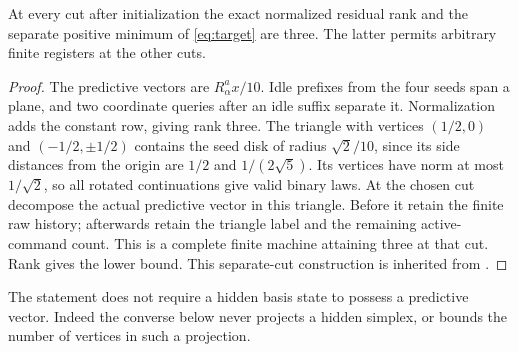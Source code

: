 \begin{proposition}\label{prop:separate}
At every cut after initialization the exact normalized residual rank
and the separate positive minimum of \eqref{eq:target} are three. The
latter permits arbitrary finite registers at the other cuts.
\end{proposition}
\begin{proof}
The predictive vectors are $R_\alpha^a x/10$. Idle prefixes from the
four seeds span a plane, and two coordinate queries after an idle suffix
separate it. Normalization adds the constant row, giving rank three.
The triangle with vertices $(1/2,0)$ and $(-1/2,\pm1/2)$ contains the
seed disk of radius $\sqrt2/10$, since its side distances from the
origin are $1/2$ and $1/(2\sqrt5)$. Its vertices have norm at most
$1/\sqrt2$, so all rotated continuations give valid binary laws.
At the chosen cut decompose the actual predictive vector in this
triangle. Before it retain the finite raw history; afterwards retain
the triangle label and the remaining active-command count. This is a
complete finite machine attaining three at that cut. Rank gives the
lower bound. This separate-cut construction is inherited from
\cite{GTF32,GTF33}.
\end{proof}

The statement does not require a hidden basis state to possess a
predictive vector. Indeed the converse below never projects a hidden
simplex, or bounds the number of vertices in such a projection.
